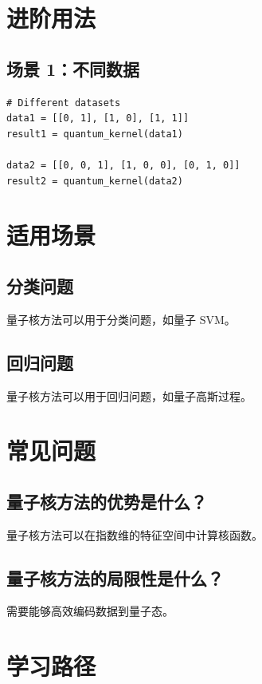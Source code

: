 \documentclass[12pt,a4paper]{article}
\begin{document}
\section{进阶用法}

\subsection{场景 1：不同数据}

\begin{lstlisting}[style=python]
# Different datasets
data1 = [[0, 1], [1, 0], [1, 1]]
result1 = quantum_kernel(data1)

data2 = [[0, 0, 1], [1, 0, 0], [0, 1, 0]]
result2 = quantum_kernel(data2)
\end{lstlisting}

\section{适用场景}

\subsection{分类问题}

量子核方法可以用于分类问题，如量子 SVM。

\subsection{回归问题}

量子核方法可以用于回归问题，如量子高斯过程。

\section{常见问题}

\subsection{量子核方法的优势是什么？}

量子核方法可以在指数维的特征空间中计算核函数。

\subsection{量子核方法的局限性是什么？}

需要能够高效编码数据到量子态。

\section{学习路径}
\end{document}
